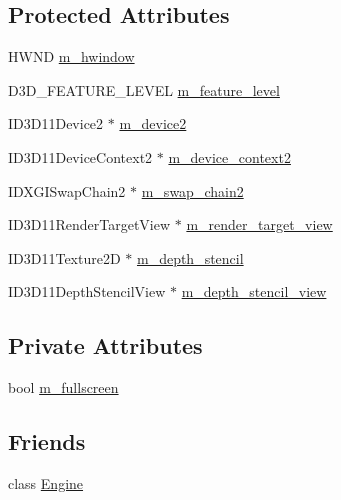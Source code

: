 \subsection*{Protected Attributes}
\begin{DoxyCompactItemize}
\item 
H\+W\+ND \hyperlink{classmage_1_1_renderer_afc314c8b146c3709edfd5349257a8387}{m\+\_\+hwindow}
\item 
D3\+D\+\_\+\+F\+E\+A\+T\+U\+R\+E\+\_\+\+L\+E\+V\+EL \hyperlink{classmage_1_1_renderer_aa97b108ef58f7d41ddb527f6ba2bfdf9}{m\+\_\+feature\+\_\+level}
\item 
I\+D3\+D11\+Device2 $\ast$ \hyperlink{classmage_1_1_renderer_a5af9d44e53bd523136cc52855a2dbe25}{m\+\_\+device2}
\item 
I\+D3\+D11\+Device\+Context2 $\ast$ \hyperlink{classmage_1_1_renderer_a57bee762f1a8c0ca13c62874a4297f48}{m\+\_\+device\+\_\+context2}
\item 
I\+D\+X\+G\+I\+Swap\+Chain2 $\ast$ \hyperlink{classmage_1_1_renderer_a64eb8b31f6835322d13e1d9b8ea9e113}{m\+\_\+swap\+\_\+chain2}
\item 
I\+D3\+D11\+Render\+Target\+View $\ast$ \hyperlink{classmage_1_1_renderer_a60eeb3b440c2c8a027b583ab93830d73}{m\+\_\+render\+\_\+target\+\_\+view}
\item 
I\+D3\+D11\+Texture2D $\ast$ \hyperlink{classmage_1_1_renderer_a1c19b2fb0347ab2e93f19d7a9d53a947}{m\+\_\+depth\+\_\+stencil}
\item 
I\+D3\+D11\+Depth\+Stencil\+View $\ast$ \hyperlink{classmage_1_1_renderer_a85b04ce9e3d0086c499910b2df82876d}{m\+\_\+depth\+\_\+stencil\+\_\+view}
\end{DoxyCompactItemize}
\subsection*{Private Attributes}
\begin{DoxyCompactItemize}
\item 
bool \hyperlink{classmage_1_1_renderer_a72bb88b17491bd388460afae9d207b0a}{m\+\_\+fullscreen}
\end{DoxyCompactItemize}
\subsection*{Friends}
\begin{DoxyCompactItemize}
\item 
class \hyperlink{classmage_1_1_renderer_a3e1914489e4bed4f9f23cdeab34a43dc}{Engine}
\end{DoxyCompactItemize}
